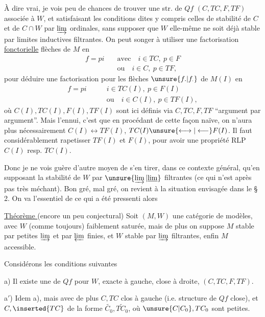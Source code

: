 À dire vrai, je vois peu de chances de trouver une str. de $Qf$ $(C,TC,F,TF)$ associée à $W$, et satisfaisant  les conditions dites y compris celles de stabilité de $C$ et de $C\cap W$ par $\varinjlim$ ordinales, sans supposer que $W$ elle-même ne soit déjà stable par  limites inductives filtrantes.
On peut songer à utiliser une factorisation \uline{fonctorielle}  flèches de $M$ en
\[
\begin{aligned}
f=pi\quad &\text{avec}\quad i\in TC,\ p\in F\\
&\text{ou}\quad i\in C,\ p\in TF,
\end{aligned}
\]
pour déduire une factorisation  pour les flèches $\unsure{f.|f_{\cdot}}$ de $M(I)$ en
\[
\begin{aligned}
f=pi\qquad &i\in TC(I),\ p\in F(I)\\
&\text{ou}\quad i\in C(I),\ p\in TF(I),
\end{aligned}
\]
où $C(I),TC(I),F(I),TF(I)$ sont ici définis via $C,TC,F,TF$ ``argument par argument''. Mais l'ennui, c'est que en procédant de cette façon naïve, on n'aura plus nécessairement $C(I)\longleftrightarrow TF(I)$, $TC(I)\unsure{\longleftrightarrow|\longleftarrow} F(I)$. Il faut considérablement rapetisser $TF(I)$ et $F(I)$, pour avoir une propriété RLP  $C(I)$ resp. $TC(I)$.

Donc je ne vois guère d'autre moyen de s'en tirer, dans ce contexte général, qu'en supposant la stabilité de $W$ par $\unsure{\varinjlim|\underline{\lim}}$ filtrantes (ce qui n'est après  pas très méchant).
Bon gré, mal gré, on revient à la situation envisagée dans le \S\,2. On va  l'essentiel de ce qui a été pressenti alors

\uline{Théorème } (encore un peu conjectural) Soit $(M,W)$ une catégorie de modèles, avec $W$ (comme toujours) faiblement saturée, mais de plus on suppose $M$ stable par petites $\varinjlim$ et par $\varprojlim$ finies, et $W$ stable par $\varinjlim$ filtrantes, enfin $M$ accessible.

Considérons les conditions suivantes

a) Il existe une  de $Qf$ pour $W$, exacte à gauche, close à droite, $(C,TC,F,TF)$.

a$'$) Idem a), mais avec  de plus $C,TC$ clos à gauche (i.e.  structure de $Qf$ close), et  $C,\inserted{TC}$ de la forme $\widetilde{C_{0}},\widetilde{TC_{0}}$, où $\unsure{C|C_{0}},TC_{0}$ sont petites.

